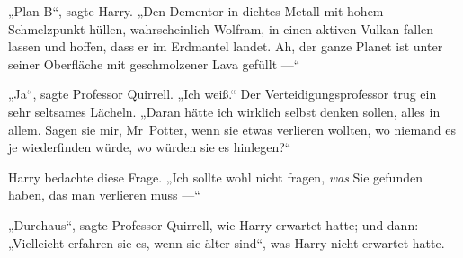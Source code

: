 „Plan B“, sagte Harry.
„Den Dementor in dichtes Metall mit hohem Schmelzpunkt hüllen, wahrscheinlich Wolfram, in einen aktiven Vulkan fallen lassen und hoffen, dass er im Erdmantel landet. Ah, der ganze Planet ist unter seiner Oberfläche mit geschmolzener Lava gefüllt —“

„Ja“, sagte Professor Quirrell.
„Ich weiß.“ Der Verteidigungsprofessor trug ein sehr seltsames Lächeln.
„Daran hätte ich wirklich selbst denken sollen, alles in allem. Sagen sie mir, Mr~Potter, wenn sie etwas verlieren wollten, wo niemand es je wiederfinden würde, wo würden sie es hinlegen?“

Harry bedachte diese Frage.
„Ich sollte wohl nicht fragen, \emph{was} Sie gefunden haben, das man verlieren muss —“

„Durchaus“, sagte Professor Quirrell, wie Harry erwartet hatte; und dann:
„Vielleicht erfahren sie es, wenn sie älter sind“, was Harry nicht erwartet hatte.

